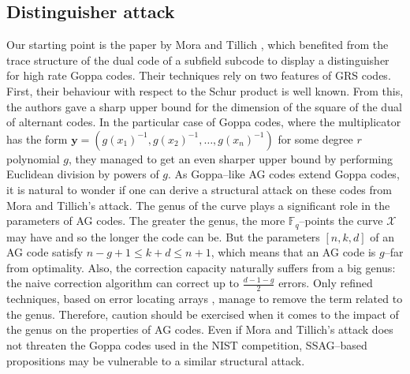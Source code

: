 \documentclass[a4paper]{amsart}
\theoremstyle{definition}
\theoremstyle{remark}
\newcommand{\calX}{\mathcal{X}}
\newcommand{\F}{\mathbb{F}}
\begin{document}
\subsection*{Distinguisher attack}
Our starting point is the paper by Mora and Tillich \cite{MT21}, which benefited from the trace structure of the dual code of a subfield subcode to display a distinguisher for high rate Goppa codes. Their techniques rely on two features of GRS codes. First, their behaviour with respect to the Schur product is well known. From this, the authors gave a sharp upper bound for the dimension of the square of the dual of alternant codes. In the particular case of Goppa codes, where the multiplicator has the form $\mathbf{y}=(g(x_1)^{-1},g(x_2)^{-1},\dots,g(x_n)^{-1})$ for some degree $r$ polynomial $g$, they managed to get an even sharper upper bound by performing Euclidean division by powers of $g$.
As Goppa--like AG codes extend Goppa codes, it is natural to wonder if one can derive a structural attack on these codes from Mora and Tillich's attack. The genus of the curve plays a significant role in the parameters of AG codes. The greater the genus, the more $\F_q$--points the curve $\calX$ may have and so the longer the code can be. But the parameters $[n,k,d]$ of an AG code satisfy $n-g+1 \leq k+d \leq n+1$, which means that an AG code is $g$--far from optimality. Also, the correction capacity naturally suffers from a big genus: the naive correction algorithm can correct up to $\frac{d-1-g}{2}$ errors. Only refined techniques, based on error locating arrays \cite{CP20}, manage to remove the term related to the genus. Therefore, caution should be exercised when it comes to the impact of the genus on the properties of AG codes.
Even if Mora and Tillich's attack does not threaten the Goppa codes used in the NIST competition, SSAG--based propositions may be vulnerable to a similar structural attack. 

\medskip
\end{document}
